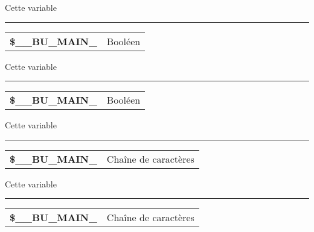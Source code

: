 \documentclass[a4paper,10pt]{article}
\begin{document}
\begin{justify}
    Cette variable
\end{justify}


\par\noindent\rule{\textwidth}{0.4pt}

\begin{justify}
    \begin{tabular}{l|l}
        \textbf{\color{vars}\$\_\_BU\_MAIN\_}       & Booléen \\[1\baselineskip]
    \end{tabular}
\end{justify}

\begin{justify}
    Cette variable
\end{justify}


\par\noindent\rule{\textwidth}{0.4pt}

\begin{justify}
    \begin{tabular}{l|l}
        \textbf{\color{vars}\$\_\_BU\_MAIN\_}    & Booléen \\[1\baselineskip]
    \end{tabular}
\end{justify}

\begin{justify}
    Cette variable
\end{justify}


\par\noindent\rule{\textwidth}{0.4pt}

\begin{justify}
    \begin{tabular}{l|l}
        \textbf{\color{vars}\$\_\_BU\_MAIN\_}  & Chaîne de caractères \\[1\baselineskip]
    \end{tabular}
\end{justify}

\begin{justify}
    Cette variable
\end{justify}


\par\noindent\rule{\textwidth}{0.4pt}

\begin{justify}
    \begin{tabular}{l|l}
        \textbf{\color{vars}\$\_\_BU\_MAIN\_}  & Chaîne de caractères \\[1\baselineskip]
    \end{tabular}
\end{justify}
\end{document}
